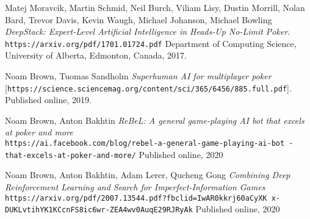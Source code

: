 \documentclass{article}
\begin{document}
\begin{thebibliography}{9}
Matej Moravcik, Martin Schmid, Neil Burch, Viliam Lisy, Dustin Morrill, Nolan Bard, Trevor Davis, Kevin Waugh, Michael Johanson, Michael Bowling
\textit{DeepStack: Expert-Level Artificial Intelligence in
Heads-Up No-Limit Poker}.
\texttt{https://arxiv.org/pdf/1701.01724.pdf}
Department of Computing Science, University of Alberta, Edmonton, Canada, 2017.

Noam Brown, Tuomas Sandholm
\textit{Superhuman AI for multiplayer poker}
[\texttt{https://science.sciencemag.org/content/sci/365/6456/885.full.pdf}].
Published online, 2019.

Noam Brown, Anton Bakhtin
\textit{ReBeL: A general game-playing AI bot that excels at poker and more}
\\\texttt{https://ai.facebook.com/blog/rebel-a-general-game-playing-ai-bot
-that-excels-at-poker-and-more/}
Published online, 2020

Noam Brown, Anton Bakhtin, Adam Lerer, Qucheng Gong
\textit{Combining Deep Reinforcement Learning and Search
for Imperfect-Information Games}
\\\texttt{https://arxiv.org/pdf/2007.13544.pdf?fbclid=IwAR0kkrj60aCyXK
x-DUKLvtihYK1KCcnFS8ic6wr-ZEA4wv0AuqE29RJRyAk}
Published online, 2020





\end{thebibliography}
\end{document}
